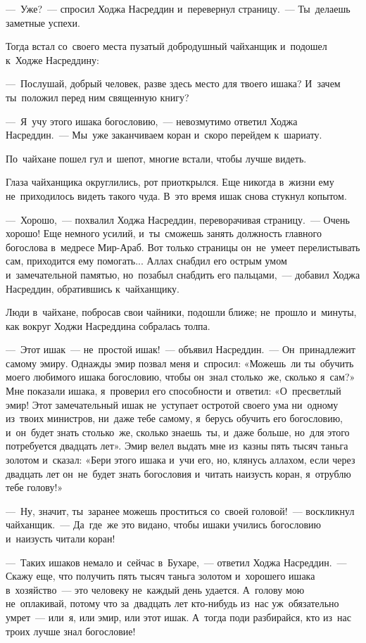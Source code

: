 \documentclass[12pt,a4paper]{book}
\begin{document}
—~Уже?~— спросил Ходжа Насреддин и~перевернул страницу.~— Ты~делаешь заметные успехи.

Тогда встал со~своего места пузатый добродушный чайханщик и~подошел к~Ходже Насреддину:

—~Послушай, добрый человек, разве здесь место для твоего ишака? И~зачем ты~положил перед ним священную книгу?

—~Я~учу этого ишака богословию,~— невозмутимо ответил Ходжа Насреддин.~— Мы~уже заканчиваем коран и~скоро перейдем к~шариату.

По~чайхане пошел гул и~шепот, многие встали, чтобы лучше видеть.

Глаза чайханщика округлились, рот приоткрылся. Еще никогда в~жизни ему не~приходилось видеть такого чуда. В~это время ишак снова стукнул копытом.

—~Хорошо,~— похвалил Ходжа Насреддин, переворачивая страницу.~— Очень хорошо! Еще немного усилий, и~ты~сможешь занять должность главного богослова в~медресе Мир-Араб. Вот только страницы он~не~умеет перелистывать сам, приходится ему помогать... Аллах снабдил его острым умом и~замечательной памятью, но~позабыл снабдить его пальцами,~— добавил Ходжа Насреддин, обратившись к~чайханщику.

Люди в~чайхане, побросав свои чайники, подошли ближе; не~прошло и~минуты, как вокруг Ходжи Насреддина собралась толпа.

—~Этот ишак~— не~простой ишак!~— объявил Насреддин.~— Он~принадлежит самому эмиру. Однажды эмир позвал меня и~спросил: «Можешь~ли ты~обучить моего любимого ишака богословию, чтобы он~знал столько~же, сколько я~сам?» Мне показали ишака, я~проверил его способности и~ответил: «О~пресветлый эмир! Этот замечательный ишак не~уступает остротой своего ума ни~одному из~твоих министров, ни~даже тебе самому, я~берусь обучить его богословию, и~он~будет знать столько~же, сколько знаешь~ты, и~даже больше, но~для этого потребуется двадцать лет». Эмир велел выдать мне из~казны пять тысяч таньга золотом и~сказал: «Бери этого ишака и~учи его, но, клянусь аллахом, если через двадцать лет он~не~будет знать богословия и~читать наизусть коран, я~отрублю тебе голову!»

—~Ну, значит, ты~заранее можешь проститься со~своей головой!~— воскликнул чайханщик.~— Да~где~же это видано, чтобы ишаки учились богословию и~наизусть читали коран!

—~Таких ишаков немало и~сейчас в~Бухаре,~— ответил Ходжа Насреддин.~— Скажу еще, что получить пять тысяч таньга золотом и~хорошего ишака в~хозяйство~— это человеку не~каждый день удается. А~голову мою не~оплакивай, потому что за~двадцать лет кто-нибудь из~нас уж~обязательно умрет~— или~я, или эмир, или этот ишак. А~тогда поди разбирайся, кто из~нас троих лучше знал богословие!
\end{document}
